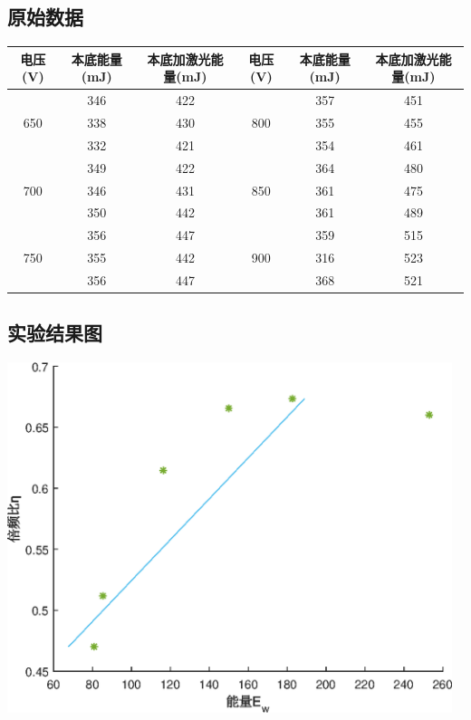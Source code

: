 \documentclass[UTF8]{ctexart}
\makeatletter
\newcommand{\figcaption}{\def\@captype{figure}\caption}
\newcommand{\tabcaption}{\def\@captype{table}\caption}
\makeatother
\begin{document}
\subsection{原始数据}
\begin{center}
	\tabcaption{原始数据记录}
	\begin{tabular}{|c|c|c|c|c|c|}
			\hline
		电压(V)&本底能量(mJ)&本底加激光能量(mJ)&电压(V)&本底能量(mJ)&本底加激光能量(mJ)\\ \hline
		\multirow{3}{*}{650}&346&422&\multirow{3}{*}{800}&357&451\\
		\cline{2-3} \cline{5-6}	
		&338&430& &355&455\\
		\cline{2-3}	\cline{5-6}
		&332&421& &354&461\\	\hline
		\multirow{3}{*}{700}	 &349&422&\multirow{3}{*}{850}&364&480\\
		\cline{2-3} \cline{5-6}
		&346&431& &361&475\\
		\cline{2-3} \cline{5-6}
		&350&442& &361&489\\ \hline
		\multirow{3}{*}{750} &356&447&\multirow{3}{*}{900}&359&515\\ 
		\cline{2-3} \cline{5-6}
		&355&442& &316&523\\
		\cline{2-3} \cline{5-6}
		&356&447& &368&521\\ \hline
	\end{tabular}
\end{center}
\subsection{实验结果图}
\begin{center}
	\includegraphics[width=13cm]{exp7.eps}
	\figcaption{KTP晶体的倍频特性拟合曲线}\label{exp7}
\end{center}
\end{document}
